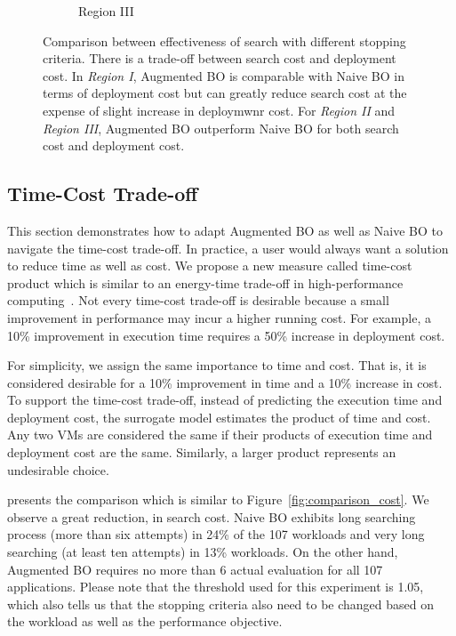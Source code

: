 \begin{figure}[!htbp]
\begin{subfigure}[b]{0.5\textwidth}
    \caption{Region III}
    \label{fig:stopping_criteria_comparison_problematic}
\end{subfigure}
\caption{Comparison between effectiveness of search with different stopping criteria.  There is a trade-off between search cost and deployment cost. In \emph{Region I}, Augmented BO is comparable with Naive BO in terms of deployment cost but can greatly reduce search cost at the expense of slight increase in deploymwnr cost. For \emph{Region II} and \emph{Region III}, Augmented BO outperform Naive BO for both search cost and deployment cost.}
\label{fig:stopping_criteria_comparison}
\end{figure}


\subsection{Time-Cost Trade-off}
\label{sec:tradeoff}

This section demonstrates how to adapt Augmented BO as well as Naive BO to navigate the time-cost trade-off. In practice, a user would always want a solution to reduce time as well as cost. We propose a new measure called time-cost product which is similar to an energy-time trade-off in high-performance computing~\cite{Freeh2007}.
Not every time-cost trade-off is desirable because
a small improvement in performance may incur a higher running cost.
For example, a 10\% improvement in execution time requires
a 50\% increase in deployment cost. 

For simplicity, we assign the same importance to time and cost.
That is, it is considered desirable for a 10\% improvement in time and
a 10\% increase in cost.
To support the time-cost trade-off, instead of predicting the execution time
and deployment cost, the surrogate model estimates the product of time and cost. Any two VMs are considered the same if their products of execution time and deployment cost are the same.
Similarly, a larger product represents an undesirable choice.

\myfigure{\ref{fig:comparison_cdp_1.05}}  presents the comparison which is similar to Figure~\ref{fig:comparison_cost}. We observe a great reduction,  in search cost.
Naive BO exhibits long searching process (more than six attempts) in 24\% of the 107 workloads and very long searching (at least ten attempts) in 13\% workloads. On the other hand, Augmented BO requires no more than 6 actual evaluation
for all 107 applications. Please note that the threshold used for this experiment is 1.05, which also tells us that the stopping criteria also need to be changed based on the workload as well as the performance objective.

